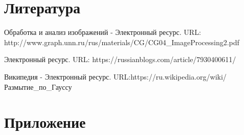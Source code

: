 \documentclass{report}
\begin{document}
\newpage

\section*{Литература}
\par Обработка и анализ изображений - Электронный ресурс. \newline URL: http://www.graph.unn.ru/rus/materials/CG/CG04_ImageProcessing2.pdf
\par Электронный ресурс.  \newline URL: https://russianblogs.com/article/7930400611/
\par Википедия - Электронный ресурс. \newline URL:https://ru.wikipedia.org/wiki/Размытие_по_Гауссу

\newpage

\section*{Приложение}
\end{document}
